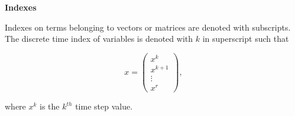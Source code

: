  \textbf{Indexes}

 Indexes on terms belonging to vectors or matrices are denoted with subscripts. The discrete time index of variables is denoted with $k$ in superscript such that 

\vspace{-6mm}
\begin{equation*}
 x = 
 \begin{pmatrix}

 		 x^k 	\\
		 x^{k+1} 	\\
 		 \vdots \\
		 x^r

 \end{pmatrix},
 \end{equation*}
 \vspace{-6mm}

 where $x^k$ is the $k^{th}$ time step value. 



 









